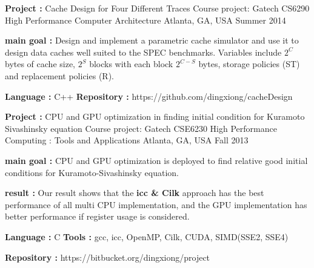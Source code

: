 \begin{cventries}
\cventry
{\textbf{Project :} Cache Design for Four Different Traces} 
{Course project: Gatech CS6290 High Performance Computer Architecture} 
{Atlanta, GA, USA} %
{Summer 2014} %
{
  \begin{cvitems}
  \item {\textbf{main goal :} Design and implement a parametric cache
      simulator and use it to design data caches well suited to the SPEC benchmarks. 
      Variables include $2^C$ bytes of cache size, $2^S$ blocks with each block $2^{C-S}$ bytes,
      storage policies (ST) and replacement policies (R).
    }
  \item {\textbf{Language :} C++  \quad
      \textbf{Repository :} {\color{red} https://github.com/dingxiong/cacheDesign}
    }
  \end{cvitems}
}

\cventry
{\textbf{Project :} CPU and GPU optimization in finding initial 
  condition for Kuramoto Sivashinsky equation} 
{Course project: Gatech CSE6230 High Performance Computing : Tools and Applications} 
{Atlanta, GA, USA} %
{Fall 2013} %
{
  \begin{cvitems}
  \item {\textbf{main goal :} CPU and GPU optimization is deployed to find relative 
      good initial conditions for Kuramoto-Sivashinsky equation. 
    }
    \item {\textbf{result : }Our result shows that the 
      \textbf{icc \& Cilk} approach has the best performance of all multi CPU implementation, and
      the GPU implementation has better performance if register usage is considered.
    }
  \item {\textbf{Language :} C \quad 
      \textbf{Tools : } gcc, icc, OpenMP, Cilk, CUDA, SIMD(SSE2, SSE4)
    }
  \item {
      \textbf{Repository :} {\color{red} https://bitbucket.org/dingxiong/project}
    }
  \end{cvitems}
}





\end{cventries}
